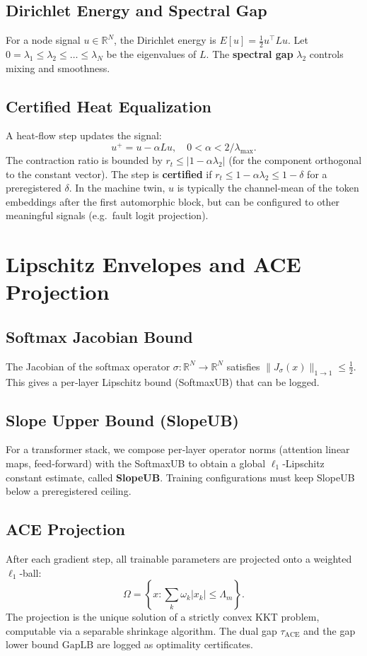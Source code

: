 \documentclass[12pt]{article}
\theoremstyle{plain}
\theoremstyle{definition}
\theoremstyle{remark}
\begin{document}
\subsection{Dirichlet Energy and Spectral Gap}
For a node signal $u \in \mathbb{R}^N$, the Dirichlet energy is $E[u] = \frac{1}{2} u^\top L u$. Let $0 = \lambda_1 \le \lambda_2 \le \dots \le \lambda_N$ be the eigenvalues of $L$. The \textbf{spectral gap} $\lambda_2$ controls mixing and smoothness.

\subsection{Certified Heat Equalization}
A heat‑flow step updates the signal:
\[
u^+ = u - \alpha L u, \quad 0 < \alpha < 2/\lambda_{\max}.
\]
The contraction ratio is bounded by $r_t \le |1 - \alpha \lambda_2|$ (for the component orthogonal to the constant vector). The step is \textbf{certified} if $r_t \le 1 - \alpha \lambda_2 \le 1 - \delta$ for a preregistered $\delta$. In the machine twin, $u$ is typically the channel‑mean of the token embeddings after the first automorphic block, but can be configured to other meaningful signals (e.g.\ fault logit projection).

\section{Lipschitz Envelopes and ACE Projection}
\label{sec:lipschitz}

\subsection{Softmax Jacobian Bound}
The Jacobian of the softmax operator $\sigma: \mathbb{R}^N \to \mathbb{R}^N$ satisfies $\|J_\sigma(x)\|_{1\to1} \le \frac12$. This gives a per‑layer Lipschitz bound (SoftmaxUB) that can be logged.

\subsection{Slope Upper Bound (SlopeUB)}
For a transformer stack, we compose per‑layer operator norms (attention linear maps, feed‑forward) with the SoftmaxUB to obtain a global $\ell_1$‑Lipschitz constant estimate, called \textbf{SlopeUB}. Training configurations must keep SlopeUB below a preregistered ceiling.

\subsection{ACE Projection}
After each gradient step, all trainable parameters are projected onto a weighted $\ell_1$‑ball:
\[
\Omega = \left\{ x : \sum_k \omega_k |x_k| \le \Lambda_m \right\}.
\]
The projection is the unique solution of a strictly convex KKT problem, computable via a separable shrinkage algorithm. The dual gap $\tau_{\text{ACE}}$ and the gap lower bound $\text{GapLB}$ are logged as optimality certificates.
\end{document}
